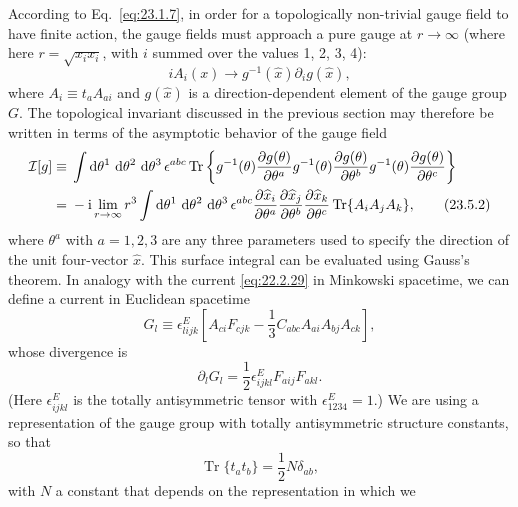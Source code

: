 According to Eq.~\eqref{eq:23.1.7}, in order for a topologically
non-trivial gauge field to have finite action, the gauge fields must
approach a pure gauge at $r\to\infty$ (where here
$r=\sqrt{x_ix_i}$, with $i$ summed over the values 1, 2, 3, 4):
\begin{equation}
iA_i(x)\longrightarrow g^{-1}(\widehat x)\partial_i g(\widehat x),
\tag{23.5.1}\label{eq:23.5.1}
\end{equation}
where $A_i\equiv t_a A_{a i}$ and $g(\widehat x)$ is a
direction-dependent element of the gauge group $G$. The topological
invariant discussed in the previous section may therefore be written in
terms of the asymptotic behavior of the gauge field
\begin{align}
\mathcal I[g]\equiv{}&
\int \mathop{}\!\mathrm{d}\theta^1\,\mathop{}\!\mathrm{d}\theta^2\,\mathop{}\!\mathrm{d}\theta^3\,\epsilon^{abc}
\operatorname{Tr}\left\{
g^{-1}(\theta)\frac{\partial g(\theta)}{\partial\theta^a}
g^{-1}(\theta)\frac{\partial g(\theta)}{\partial\theta^b}
g^{-1}(\theta)\frac{\partial g(\theta)}{\partial\theta^c}
\right\}
\notag\\
={}&-\mathrm{i}\lim_{r\to\infty}r^3
\int \mathop{}\!\mathrm{d}\theta^1\,\mathop{}\!\mathrm{d}\theta^2\,\mathop{}\!\mathrm{d}\theta^3\,\epsilon^{abc}
\frac{\partial\widehat x_i}{\partial\theta^a}
\frac{\partial\widehat x_j}{\partial\theta^b}
\frac{\partial\widehat x_k}{\partial\theta^c}
\operatorname{Tr}\{A_iA_jA_k\},
\tag{23.5.2}\label{eq:23.5.2}
\end{align}
where $\theta^a$ with $a=1,2,3$ are any three parameters used to specify
the direction of the unit four-vector $\widehat x$. This surface integral
can be evaluated using Gauss's theorem. In analogy with the current
\eqref{eq:22.2.29} in Minkowski spacetime, we can define a current in
Euclidean spacetime
\begin{equation}
G_l\equiv\epsilon^E_{lijk}\left[
A_{c i}F_{c jk}
-\frac13C_{abc}
A_{a i}A_{b j}A_{c k}
\right],
\tag{23.5.3}\label{eq:23.5.3}
\end{equation}
whose divergence is
\begin{equation}
\partial_lG_l=\frac12\epsilon^E_{ijkl}F_{a ij}F_{a kl}.
\tag{23.5.4}\label{eq:23.5.4}
\end{equation}
(Here $\epsilon^E_{ijkl}$ is the totally antisymmetric tensor with
$\epsilon^E_{1234}=1$.) We are using a representation of the gauge group
with totally antisymmetric structure constants, so that
\begin{equation}
\operatorname{Tr}\{t_a t_b\}=\frac12N\delta_{ab},
\tag{23.5.5}\label{eq:23.5.5}
\end{equation}
with $N$ a constant that depends on the representation in which we
